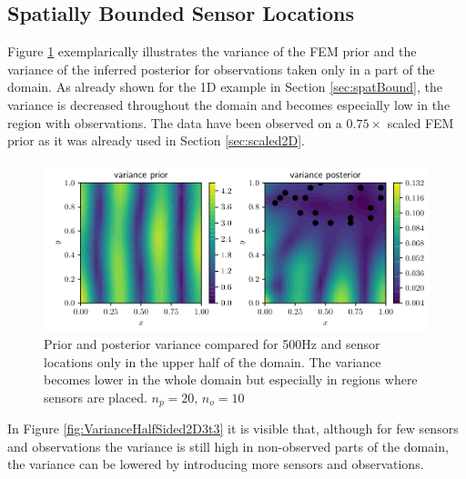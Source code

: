 \documentclass[%
  a4paper,oneside,%
  11pt,%
  smallchapters,
  style=printdev,
  extramargin,
  green,%
  rgb, <cmyk>
  ]{tubsbook}
\begin{document}
\subsection{Spatially Bounded Sensor Locations}
Figure \ref{fig:VarianceHalfSided2D} exemplarically illustrates the variance of the FEM prior and the variance of the inferred posterior for observations taken only in a part of the domain. As already shown for the 1D example in Section \ref{sec:spatBound}, the variance is decreased throughout the domain and becomes especially low in the region with observations. The data have been observed on a $0.75\times$ scaled FEM prior as it was already used in Section \ref{sec:scaled2D}.
\begin{figure}[!ht]
\includegraphics[width=1\textwidth]{../../Python/Results/2D/HalfSide/3/HalfSide.pdf}
\centering
\caption{Prior and posterior variance compared for 500Hz and sensor locations only in the upper half of the domain. The variance becomes lower in the whole domain but especially in regions where sensors are placed. $n_p=20$, $n_o=10$}
\label{fig:VarianceHalfSided2D}
\end{figure}

In Figure \ref{fig:VarianceHalfSided2D3t3} it is visible that, although for few sensors and observations the variance is still high in non-observed parts of the domain, the variance can be lowered by introducing more sensors and observations.
\end{document}

